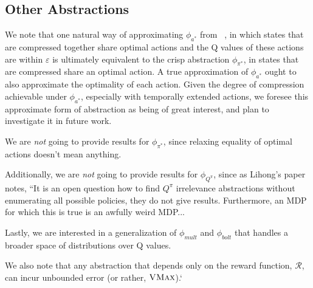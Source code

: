 \subsection{Other Abstractions}

We note that one natural way of approximating $\phi_{a^*}$ from ~\cite{li2006towards}, in which states that are compressed together share optimal actions and the Q values of these actions are within $\varepsilon$ is ultimately equivalent to the crisp abstraction $\phi_{\pi^*}$, in states that are compressed share an optimal action. A true approximation of $\phi_{a^*}$ ought to also approximate the optimality of each action. Given the degree of compression achievable under $\phi_{a^*}$, especially with temporally extended actions, we foresee this approximate form of abstraction as being of great interest, and plan to investigate it in future work.

We are {\it not} going to provide results for $\phi_{\pi^*}$, since relaxing equality of optimal actions doesn't mean anything.

Additionally, we are {\it not} going to provide results for $\phi_{Q^\pi}$, since as Lihong's paper notes, ``It is an open question how to find $Q^\pi$ irrelevance abstractions without enumerating all possible policies, they do not give results. Furthermore, an MDP for which this is true is an awfully weird MDP...

Lastly, we are interested in a generalization of $\phi_{mult}$  and $\phi_{bolt}$ that handles a broader space of distributions over Q values.

We also note that any abstraction that depends only on the reward function, $\mathcal{R}$, can incur unbounded error (or rather, $\textsc{VMax}$).`




